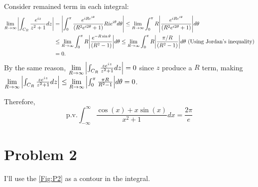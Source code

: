 \documentclass{article}
\begin{document}
Consider remained term in each integral:
\begin{equation*}
\begin{split}
\lim\limits_{R\rightarrow \infty}\abs{\int_{C_R} \frac{e^{iz}}{z^2+1}dz}&=\abs{\int_0^\pi \frac{e^{iRe^{i\theta}}}{(R^2e^{i2\theta}+1)}Rie^{i\theta}d\theta}\leq \lim\limits_{R\rightarrow \infty} \int_0^\pi R\abs{\frac{e^{iRe^{i\theta}}}{(R^2e^{i2\theta}+1)}}d\theta \\
&\leq\lim\limits_{R\rightarrow \infty} \int_0^\pi R\abs{\frac{e^{-R\sin\theta}}{(R^2-1)}}d\theta\leq \lim\limits_{R\rightarrow \infty} \int_0^\pi R\abs{\frac{\pi/R}{(R^2-1)}}d\theta \text{ (Using Jordan's inequality)} \\
&=0.
\end{split}
\end{equation*}
By the same reason, $\lim\limits_{R\rightarrow \infty}\abs{\int_{C_R} \frac{ze^{iz}}{z^2+1}dz}=0$ since $z$ produce a $R$ term, making $\lim\limits_{R\rightarrow \infty}\abs{\int_{C_R} \frac{ze^{iz}}{z^2+1}dz}\leq \lim\limits_{R\rightarrow \infty}\abs{\int_0^\pi \frac{\pi R}{R^2-1}}d\theta=0$.

Therefore,
\begin{equation*}
\text{p.v.}\int_{-\infty}^\infty\frac{\cos(x)+x\sin(x)}{x^2+1}dx=\frac{2\pi}{e}
\end{equation*}

\section*{Problem 2}
I'll use the \ref{Fig:P2} as a contour in the integral.
\end{document}
